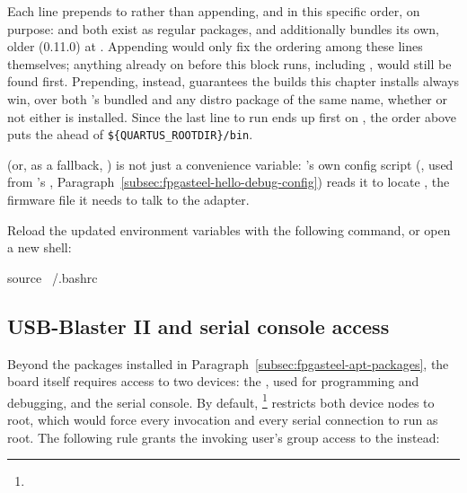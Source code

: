 Each line prepends to  rather than appending, and in this specific order, on purpose:  and  both exist as regular  packages, and  additionally bundles its own, older  (0.11.0) at . Appending would only fix the ordering among these lines themselves; anything already on  before this block runs, including , would still be found first. Prepending, instead, guarantees the  builds this chapter installs always win, over both 's bundled  and any distro package of the same name, whether or not either is installed. Since the last line to run ends up first on , the order above puts the  ahead of \lstinline[style=inlineFsExt]!${QUARTUS_ROOTDIR}/bin!.

 (or, as a fallback, ) is not just a convenience variable: 's own  config script (, used from 's , Paragraph~\ref{subsec:fpgasteel-hello-debug-config}) reads it to locate , the  firmware file it needs to talk to the  adapter.

Reload the updated environment variables with the following command, or open a new shell:

\begin{shellcodehost}
source ~/.bashrc
\end{shellcodehost}

\subsection{USB-Blaster II and serial console access}
\label{subsec:fpgasteel-usb-blaster}

Beyond the packages installed in Paragraph~\ref{subsec:fpgasteel-apt-packages}, the board itself requires access to two  devices: the , used for  programming and debugging, and the  serial console. By default, \footnote{} restricts both device nodes to root, which would force every  invocation and every serial connection to run as root. The following rule grants the invoking user's group access to the  instead:

